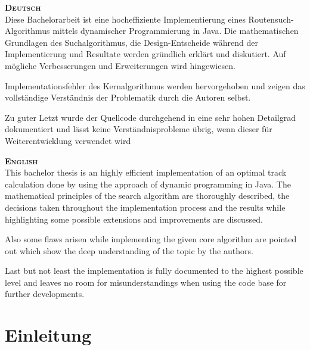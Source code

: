 \documentclass[a4paper,10pt]{article}
\begin{document}
\vspace*{2cm}
\setlength{\columnsep}{2cm}
\begin{multicols}{2}

\textbf{\textsc{Deutsch}}
\vspace{1cm}\\

Diese Bachelorarbeit ist eine hocheffiziente Implementierung eines
Routensuch-Algorithmus mittels dynamischer Programmierung in Java. Die
mathematischen Grundlagen des Suchalgorithmus, die Design-Entscheide während
der Implementierung und Resultate werden gründlich erklärt und diskutiert.
Auf mögliche Verbesserungen und Erweiterungen wird hingewiesen.

Implementationsfehler des Kernalgorithmus werden hervorgehoben und zeigen das
vollständige Verständnis der Problematik durch die Autoren selbst.

Zu guter Letzt wurde der Quellcode durchgehend in eine sehr hohen Detailgrad
dokumentiert und lässt keine Verständnisprobleme übrig, wenn dieser für
Weiterentwicklung verwendet wird

\columnbreak

\textbf{\textsc{English}}
\vspace{1cm}\\

This bachelor thesis is an highly efficient implementation of an optimal track
calculation done by using the approach of dynamic programming in Java. The
mathematical principles of the search algorithm are thoroughly described, the
decisions taken throughout the implementation process and the results while
highlighting some possible extensions and improvements are discussed.

Also some flaws arisen while implementing the given core algorithm are pointed
out which show the deep understanding of the topic by the authors.

Last but not least the implementation is fully documented to the highest possible
level and leaves no room for misunderstandings when using the code base for
further developments.

\end{multicols}
\newpage

\cleardoublepage
\begingroup
\pagestyle{empty}
\setcounter{tocdepth}{2}
\tableofcontents
\clearpage
\endgroup
       
\newpage

\setcounter{page}{1} 
\part{Einleitung}
\end{document}
